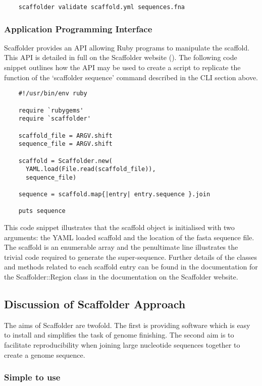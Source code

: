 \documentclass[10pt]{bmc_article}
\newenvironment{bmcformat}{\begin{raggedright}\baselineskip20pt\sloppy\setboolean{publ}{false}}{\end{raggedright}\baselineskip20pt\sloppy}
\begin{document}
\begin{bmcformat}
  \begin{verbatim}
    scaffolder validate scaffold.yml sequences.fna
  \end{verbatim}

\subsubsection*{Application Programming Interface} %

Scaffolder provides an API allowing Ruby programs to manipulate the scaffold.
This API is detailed in full on the Scaffolder website (\scaffolder). The
following code snippet outlines how the API may be used to create a script to
replicate the function of the `scaffolder sequence' command described in the
CLI section above. \pb

  \begin{verbatim}
    #!/usr/bin/env ruby

    require `rubygems'
    require `scaffolder'

    scaffold_file = ARGV.shift
    sequence_file = ARGV.shift

    scaffold = Scaffolder.new(
      YAML.load(File.read(scaffold_file)),
      sequence_file)

    sequence = scaffold.map{|entry| entry.sequence }.join

    puts sequence
  \end{verbatim}

This code snippet illustrates that the scaffold object is initialised with two
arguments: the YAML loaded scaffold and the location of the fasta sequence
file. The scaffold is an enumerable array and the penultimate line illustrates
the trivial code required to generate the super-sequence. Further details of
the classes and methods related to each scaffold entry can be found in the
documentation for the Scaffolder::Region class in the documentation on the
Scaffolder website. \pb

\subsection*{Discussion of Scaffolder Approach} %

The aims of Scaffolder are twofold. The first is providing software which is
easy to install and simplifies the task of genome finishing. The second aim is
to facilitate reproducibility when joining large nucleotide sequences together
to create a genome sequence. \pb

\subsubsection*{Simple to use} %


\end{bmcformat}
\end{document}
